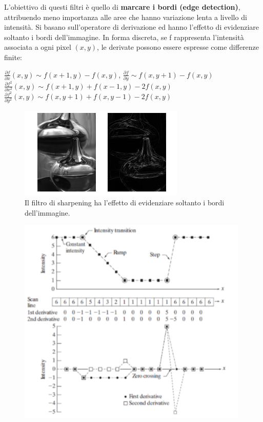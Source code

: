 L'obiettivo di questi filtri è quello di \textbf{marcare i bordi (edge detection)}, attribuendo meno importanza alle aree che hanno variazione lenta a livello di intensità.
Si basano sull'operatore di derivazione ed hanno l'effetto di evidenziare soltanto i bordi dell'immagine. In forma discreta, se f rappresenta l'intensità associata a ogni pixel
$(x,y)$, le derivate possono essere espresse come differenze finite:

\begin{center}
    $\frac{\partial{f}}{\partial{x}}(x,y) \sim f(x+1, y) − f(x, y)$, $\frac{\partial{f}}{\partial{y}} \sim f(x,y+1) − f(x,y)$
    \\
    $\frac{\partial{f^2}}{\partial{x^2}}(x,y) \sim f(x+1,y) + f(x-1, y) - 2f(x,y)$
    \\
    $\frac{\partial{f^2}}{\partial{y^2}}(x,y) \sim f(x,y+1) + f(x, y-1) - 2f(x,y)$
\end{center}

\begin{figure}[H]
    \centering
    \includegraphics[width=\linewidth, keepaspectratio]{capitoli/immagini/imgs/sharpening.png}
    \caption*{Il filtro di sharpening ha l'effetto di evidenziare soltanto i bordi dell'immagine.}
\end{figure}

\begin{figure}[H]
    \centering
    \includegraphics[width=11cm, keepaspectratio]{capitoli/immagini/imgs/sharpering2.png}
\end{figure}

